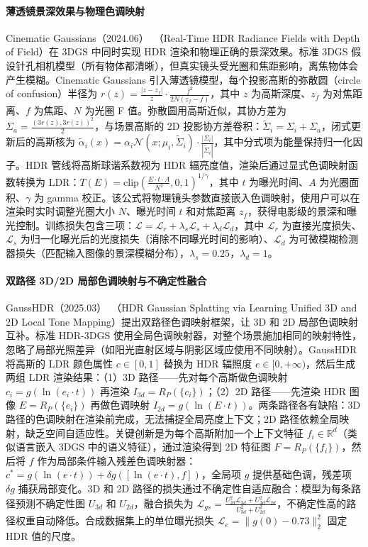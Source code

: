 \paragraph{薄透镜景深效果与物理色调映射}

Cinematic Gaussians（2024.06）~\cite{2406_07329}（Real-Time HDR Radiance Fields with Depth of Field）在 3DGS 中同时实现 HDR 渲染和物理正确的景深效果。标准 3DGS 假设针孔相机模型（所有物体都清晰），但真实镜头受光圈和焦距影响，离焦物体会产生模糊。Cinematic Gaussians 引入薄透镜模型，每个投影高斯的弥散圆（circle of confusion）半径为 $r(z) = \frac{|z - z_f|}{z} \cdot \frac{f^2}{2N(z_f - f)}$，其中 $z$ 为高斯深度、$z_f$ 为对焦距离、$f$ 为焦距、$N$ 为光圈 F 值。弥散圆用高斯近似，其协方差为 $\Sigma_a = \frac{(3r(z), 3r(z))^2}{2}$，与场景高斯的 2D 投影协方差卷积：$\tilde{\Sigma}_i = \Sigma_i + \Sigma_a$，闭式更新后的高斯核为 $\tilde{\alpha}_i(x) = \alpha_i \mathcal{N}(x; \mu_i, \tilde{\Sigma}_i) \cdot \frac{|\Sigma_i|}{|\tilde{\Sigma}_i|}$，其中分式项为能量保持归一化因子。HDR 管线将高斯球谐系数视为 HDR 辐亮度值，渲染后通过显式色调映射函数转换为 LDR：$T(E) = \text{clip}(\frac{E \cdot t \cdot A}{N^2}, 0, 1)^{1/\gamma}$，其中 $t$ 为曝光时间、$A$ 为光圈面积、$\gamma$ 为 gamma 校正。该公式将物理镜头参数直接嵌入色调映射，使用户可以在渲染时实时调整光圈大小 $N$、曝光时间 $t$ 和对焦距离 $z_f$，获得电影级的景深和曝光控制。训练损失包含三项：$\mathcal{L} = \mathcal{L}_r + \lambda_s \mathcal{L}_s + \lambda_d \mathcal{L}_d$，其中 $\mathcal{L}_r$ 为直接光度损失、$\mathcal{L}_s$ 为归一化曝光后的光度损失（消除不同曝光时间的影响）、$\mathcal{L}_d$ 为可微模糊检测器损失（匹配输入图像的景深模糊分布），$\lambda_s = 0.25$，$\lambda_d = 1$。

\paragraph{双路径 3D/2D 局部色调映射与不确定性融合}

GaussHDR（2025.03）~\cite{2503_10143}（HDR Gaussian Splatting via Learning Unified 3D and 2D Local Tone Mapping）提出双路径色调映射框架，让 3D 和 2D 局部色调映射互补。标准 HDR-3DGS 使用全局色调映射器，对整个场景施加相同的映射特性，忽略了局部光照差异（如阳光直射区域与阴影区域应使用不同映射）。GaussHDR 将高斯的 LDR 颜色属性 $c \in [0,1]$ 替换为 HDR 辐照度 $e \in [0, +\infty)$，然后生成两组 LDR 渲染结果：（1）3D 路径——先对每个高斯做色调映射 $c_i = g(\ln(e_i \cdot t))$ 再渲染 $I_{3d} = R_P(\{c_i\})$；（2）2D 路径——先渲染 HDR 图像 $E = R_P(\{e_i\})$ 再做色调映射 $I_{2d} = g(\ln(E \cdot t))$。两条路径各有缺陷：3D 路径的色调映射在渲染前完成，无法捕捉全局亮度上下文；2D 路径依赖全局映射，缺乏空间自适应性。关键创新是为每个高斯附加一个上下文特征 $f_i \in \mathbb{R}^d$（类似语言嵌入 3DGS 中的语义特征），通过渲染得到 2D 特征图 $F = R_P(\{f_i\})$，然后将 $f$ 作为局部条件输入残差色调映射器：$c^* = g(\ln(e \cdot t)) + \delta g([\ln(e \cdot t), f])$，全局项 $g$ 提供基础色调，残差项 $\delta g$ 捕获局部变化。3D 和 2D 路径的损失通过不确定性自适应融合：模型为每条路径预测不确定性图 $U_{3d}$ 和 $U_{2d}$，融合损失为 $\mathcal{L}_{gs} = \frac{U_{2d}^2 \mathcal{L}_{3d} + U_{3d}^2 \mathcal{L}_{2d}}{U_{3d}^2 + U_{2d}^2}$，不确定性高的路径权重自动降低。合成数据集上的单位曝光损失 $\mathcal{L}_e = \|g(0) - 0.73\|_2^2$ 固定 HDR 值的尺度。

